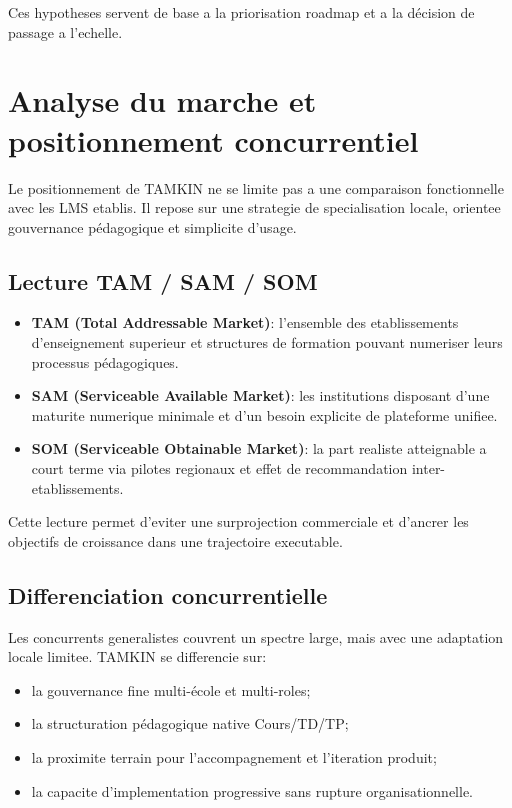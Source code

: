 \documentclass[12pt,a4paper,oneside]{report}
\begin{document}
Ces hypotheses servent de base a la priorisation roadmap et a la décision de passage a l'echelle.

\section{Analyse du marche et positionnement concurrentiel}

Le positionnement de TAMKIN ne se limite pas a une comparaison fonctionnelle avec les LMS etablis. Il repose sur une strategie de specialisation locale, orientee gouvernance pédagogique et simplicite d'usage.

\subsection{Lecture TAM / SAM / SOM}

\begin{itemize}
  \item \textbf{TAM (Total Addressable Market)}: l'ensemble des etablissements d'enseignement superieur et structures de formation pouvant numeriser leurs processus pédagogiques.
  \item \textbf{SAM (Serviceable Available Market)}: les institutions disposant d'une maturite numerique minimale et d'un besoin explicite de plateforme unifiee.
  \item \textbf{SOM (Serviceable Obtainable Market)}: la part realiste atteignable a court terme via pilotes regionaux et effet de recommandation inter-etablissements.
\end{itemize}

Cette lecture permet d'eviter une surprojection commerciale et d'ancrer les objectifs de croissance dans une trajectoire executable.

\subsection{Differenciation concurrentielle}

Les concurrents generalistes couvrent un spectre large, mais avec une adaptation locale limitee. TAMKIN se differencie sur:
\begin{itemize}
  \item la gouvernance fine multi-école et multi-roles;
  \item la structuration pédagogique native Cours/TD/TP;
  \item la proximite terrain pour l'accompagnement et l'iteration produit;
  \item la capacite d'implementation progressive sans rupture organisationnelle.
\end{itemize}
\end{document}
